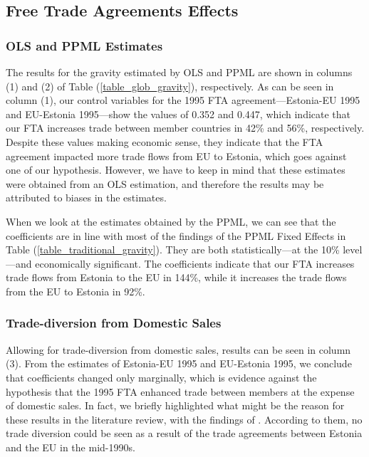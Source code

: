 \documentclass[a4paper,10pt]{article}
\begin{document}


\subsection{Free Trade Agreements Effects} \label{results_fta}

\subsubsection{OLS and PPML Estimates} \label{results_fta_ols_ppml}

The results for the gravity estimated by OLS and PPML are shown in columns (1) and (2) of Table (\ref{table_glob_gravity}), respectively. As can be seen in column (1), our control variables for the 1995 FTA agreement---Estonia-EU 1995 and EU-Estonia 1995---show the values of 0.352 and 0.447, which indicate that our FTA increases trade between member countries in 42\% and 56\%, respectively. Despite these values making economic sense, they indicate that the FTA agreement impacted more trade flows from EU to Estonia, which goes against one of our hypothesis. However, we have to keep in mind that these estimates were obtained from an OLS estimation, and therefore the results may be attributed to biases in the estimates.

When we look at the estimates obtained by the PPML, we can see that the coefficients are in line with most of the findings of the PPML Fixed Effects in Table (\ref{table_traditional_gravity}). They are both statistically---at the 10\% level---and economically significant. The coefficients indicate that our FTA increases trade flows from Estonia to the EU in 144\%, while it increases the trade flows from the EU to Estonia in 92\%.

\subsubsection{Trade-diversion from Domestic Sales} \label{results_fta_tradediversion}

Allowing for trade-diversion from domestic sales, results can be seen in column (3). From the estimates of Estonia-EU 1995 and EU-Estonia 1995, we conclude that coefficients changed only marginally, which is evidence against the hypothesis that the 1995 FTA enhanced trade between members at the expense of domestic sales. In fact, we briefly highlighted what might be the reason for these results in the literature review, with the findings of \cite{fainstein_foreign_2010}. According to them, no trade diversion could be seen as a result of the trade agreements between Estonia and the EU in the mid-1990s.
\end{document}
